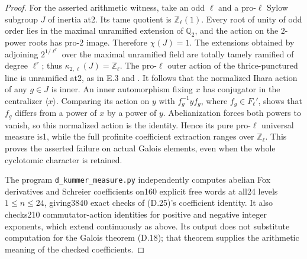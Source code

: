 \begin{proof}
For the asserted arithmetic witness, take an odd $\ell$ and a pro-$\ell$ Sylow subgroup $J$ of inertia at2. Its tame quotient is $\mathbb Z_\ell(1)$. Every root of unity of odd order lies in the maximal unramified extension of $\mathbb Q_2$, and the action on the $2$-power roots has pro-$2$ image. Therefore $\chi(J)=1$. The extensions obtained by adjoining $2^{1/\ell^r}$ over the maximal unramified field are totally tamely ramified of degree $\ell^r$; thus $\kappa_{2,\ell}(J)=\mathbb Z_\ell$. The pro-$\ell$ outer action of the thrice-punctured line is unramified at2, as in E.3 and \cite[\S8.4]{E_HainMatsumoto}. It follows that the normalized Ihara action of any $g\in J$ is inner. An inner automorphism fixing $x$ has conjugator in the centralizer $\langle x\rangle$. Comparing its action on $y$ with $f_g^{-1}yf_g$, where $f_g\in F_\ell'$, shows that $f_g$ differs from a power of $x$ by a power of $y$. Abelianization forces both powers to vanish, so this normalized action is the identity. Hence its pure pro-$\ell$ universal measure is1, while the full profinite coefficient extraction ranges over $\mathbb Z_\ell$. This proves the asserted failure on actual Galois elements, even when the whole cyclotomic character is retained.

The program \texttt{d\_kummer\_measure.py} independently computes abelian Fox derivatives and Schreier coefficients on160 explicit free words at all24 levels $1\leq n\leq24$, giving3840 exact checks of (D.25)'s coefficient identity. It also checks210 commutator-action identities for positive and negative integer exponents, which extend continuously as above. Its output does not substitute computation for the Galois theorem (D.18); that theorem supplies the arithmetic meaning of the checked coefficients.
\end{proof}
